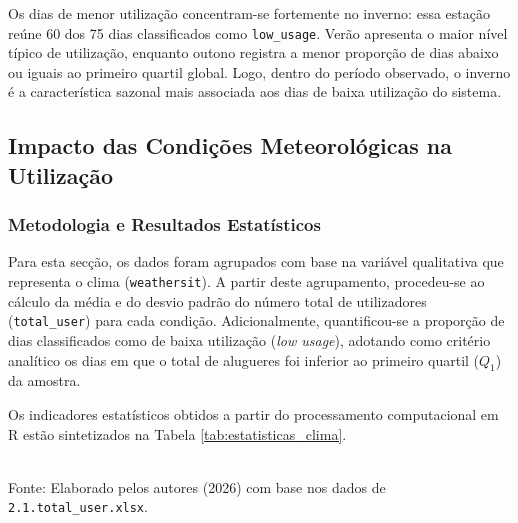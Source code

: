 \documentclass[12pt,a4paper]{article}
\begin{document}
Os dias de menor utilização concentram-se fortemente no inverno: essa estação
reúne 60 dos 75 dias classificados como \texttt{low\_usage}. Verão apresenta o
maior nível típico de utilização, enquanto outono registra a menor proporção de
dias abaixo ou iguais ao primeiro quartil global. Logo, dentro do período
observado, o inverno é a característica sazonal mais associada aos dias de
baixa utilização do sistema.

\subsection{Impacto das Condições Meteorológicas na Utilização}

\subsubsection{Metodologia e Resultados Estatísticos}
Para esta secção, os dados foram agrupados com base na variável qualitativa que representa o clima (\texttt{weathersit}). A partir deste agrupamento, procedeu-se ao cálculo da média e do desvio padrão do número total de utilizadores (\texttt{total\_user}) para cada condição. Adicionalmente, quantificou-se a proporção de dias classificados como de baixa utilização (\textit{low usage}), adotando como critério analítico os dias em que o total de alugueres foi inferior ao primeiro quartil ($Q_1$) da amostra.

Os indicadores estatísticos obtidos a partir do processamento computacional em R estão sintetizados na Tabela \ref{tab:estatisticas_clima}.

\begin{table}[H]
    \centering
    \caption{Estatísticas de utilização por condição meteorológica.}
    \vspace{0.1cm}
    \\ \vspace{0.1cm}
    \footnotesize{Fonte: Elaborado pelos autores (2026) com base nos dados de \texttt{2.1.total\_user.xlsx}.}
    \label{tab:estatisticas_clima}
\end{table}
\end{document}
